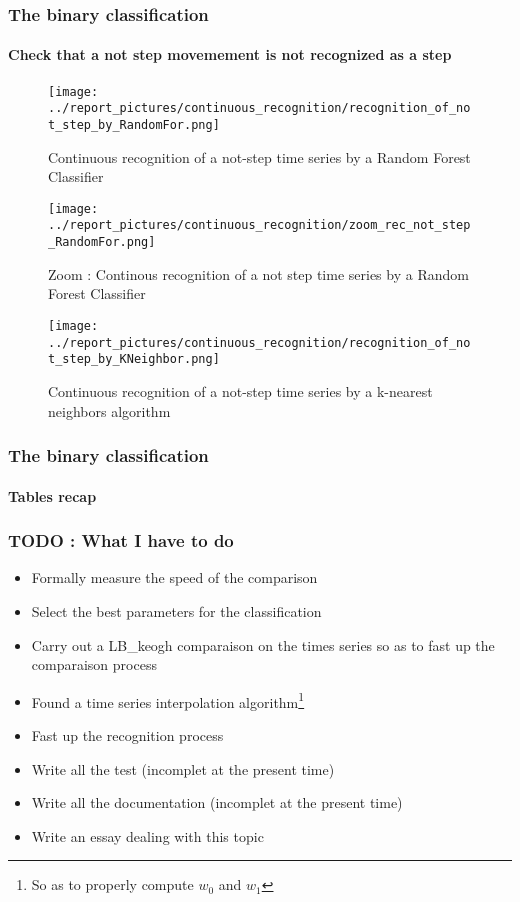 \documentclass[11pt, sans]{beamer}
\begin{document}
\begin{frame}
\frametitle{The binary classification}
\framesubtitle{Check that a not step movemement is not recognized as a step}

\begin{overprint}

\begin{figure}[H]
	\texttt{[image: ../report\_pictures/continuous\_recognition/recognition\_of\_not\_step\_by\_RandomFor.png]}
	\caption{Continuous recognition of a not-step time series by a Random Forest Classifier}
	\label{a_not-step_is_a_step}
\end{figure}

\begin{figure}[H]
	\texttt{[image: ../report\_pictures/continuous\_recognition/zoom\_rec\_not\_step\_RandomFor.png]}
	\caption{Zoom : Continous recognition of a not step time series by a Random Forest Classifier}
	\label{a_not_step_is_a_step_zoom}
\end{figure}

\begin{figure}[H]
	\texttt{[image: ../report\_pictures/continuous\_recognition/recognition\_of\_not\_step\_by\_KNeighbor.png]}
	\caption{Continuous recognition of a not-step time series by a k-nearest neighbors algorithm}
	\label{a_not-step_is_sometimes_a_step}
\end{figure}

\end{overprint}	 

\end{frame}

\begin{frame}
\frametitle{The binary classification}
\framesubtitle{Tables recap}

	

\end{frame}

\begin{frame}
	\frametitle{TODO : What I have to do}
	
	\begin{itemize}
	\item Formally measure the speed of the comparison
	\item Select the best parameters for the classification
	\item Carry out a LB\_keogh comparaison on the times series so as to fast up the comparaison process
	\item Found a time series interpolation algorithm\footnote{So as to properly compute $w_0$ and $w_1$}
	\item Fast up the recognition process
	\item Write all the test (incomplet at the present time)
	\item Write all the documentation (incomplet at the present time)
	\item Write an essay dealing with this topic
	\end{itemize}
\end{frame}	

%        
%        
\end{document}
